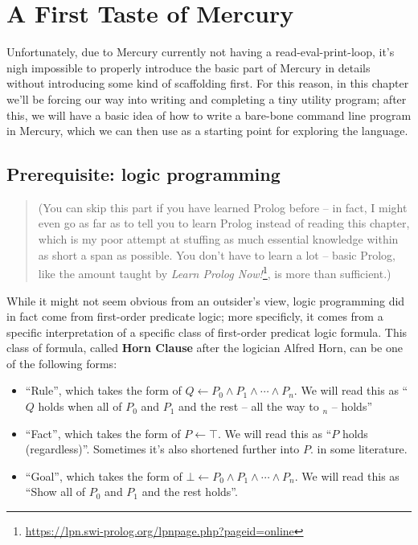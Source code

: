 \chapter{A First Taste of Mercury}

Unfortunately, due to Mercury currently not having a read-eval-print-loop, it's nigh impossible to properly introduce the basic part of Mercury in details without introducing some kind of scaffolding first. For this reason, in this chapter we'll be forcing our way into writing and completing a tiny utility program; after this, we will have a basic idea of how to write a bare-bone command line program in Mercury, which we can then use as a starting point for exploring the language.

\section{Prerequisite: logic programming}
\label{sec:org7970573}

\begin{quote}
	(You can skip this part if you have learned Prolog before -- in fact, I might even go as far as to tell you to learn Prolog instead of reading this chapter, which is my poor attempt at stuffing as much essential knowledge within as short a span as possible. You don't have to learn a lot -- basic Prolog, like the amount taught by \textit{Learn Prolog Now!}\footnote{\url{https://lpn.swi-prolog.org/lpnpage.php?pageid=online}}, is more than sufficient.)
\end{quote}

While it might not seem obvious from an outsider's view, logic programming did in fact come from first-order predicate logic; more specificly, it comes from a specific interpretation of a specific class of first-order predicat logic formula. This class of formula, called \textbf{Horn Clause} after the logician Alfred Horn, can be one of the following forms:

\begin{itemize}
	\item ``Rule'', which takes the form of \(Q \leftarrow P_0 \wedge P_1 \wedge \cdots \wedge P_n\). We will read this as ``$Q$ holds when all of $P_0$ and $P_1$ and the rest -- all the way to $_n$ -- holds''
	\item ``Fact'', which takes the form of \(P \leftarrow \top\). We will read this as ``$P$ holds (regardless)''. Sometimes it's also shortened further into $P.$ in some literature.
	\item ``Goal'', which takes the form of \(\bot \leftarrow P_0 \wedge P_1 \wedge \cdots \wedge P_n\). We will read this as ``Show all of $P_0$ and $P_1$ and the rest holds''.
\end{itemize}

